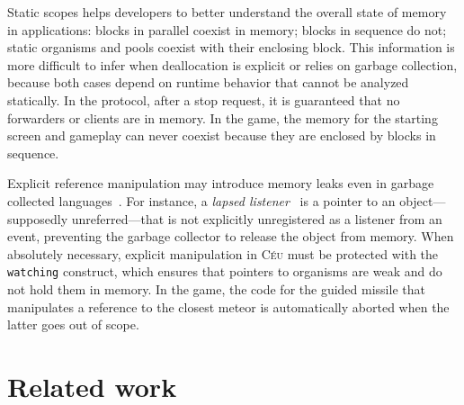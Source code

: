 \documentclass{sigplanconf}
\newcommand{\CEU}{\textsc{C\'{e}u}\xspace}
\newcommand{\code}[1] {{\small{\texttt{#1}}}}
\newcommand{\1}{\;}
\newcommand{\2}{\;\;}
\newcommand{\3}{\;\;\;}
\newcommand{\5}{\;\;\;\;\;}
\begin{document}
Static scopes helps developers to better understand the overall state of memory 
in applications: blocks in parallel coexist in memory; blocks in sequence do 
not; static organisms and pools coexist with their enclosing block.
%
This information is more difficult to infer when deallocation is explicit or 
relies on garbage collection, because both cases depend on runtime behavior 
that cannot be analyzed statically.
%
In the protocol, after a stop request, it is guaranteed that no forwarders or 
clients are in memory.
In the game, the memory for the starting screen and gameplay can never coexist 
because they are enclosed by blocks in sequence.

Explicit reference manipulation may introduce memory leaks even in garbage 
collected languages~\cite{dobbs.loiterers}.
For instance, a \emph{lapsed listener}~\cite{gamepatterns} is a pointer to an 
object---supposedly unreferred---that is not explicitly unregistered as a
listener from an event, preventing the garbage collector to release the object 
from memory.
%
When absolutely necessary, explicit manipulation in \CEU must be protected with 
the \code{watching} construct, which ensures that pointers to organisms are 
weak and do not hold them in memory.
%
In the game, the code for the guided missile that manipulates a reference to 
the closest meteor is automatically aborted when the latter goes out of scope.

\section{Related work}
\label{sec.related}

\end{document}
